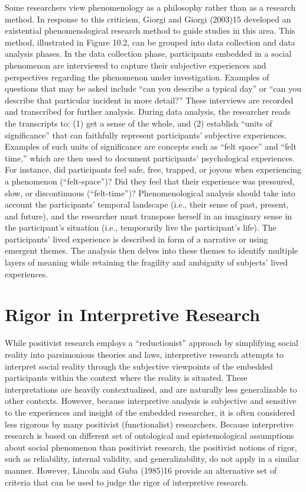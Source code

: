 Some researchers view phenomenology as a philosophy rather than as a research method. In response to this criticism, Giorgi and Giorgi (2003)15 developed an existential phenomenological research method to guide studies in this area. This method, illustrated in Figure 10.2, can be grouped into data collection and data analysis phases. In the data collection phase, participants embedded in a social phenomenon are interviewed to capture their subjective experiences and perspectives regarding the phenomenon under investigation. Examples of questions that may be asked include “can you describe a typical day” or “can you describe that particular incident in more detail?” These interviews are recorded and transcribed for further analysis. During data analysis, the researcher reads the transcripts to: (1) get a sense of the whole, and (2) establish “units of significance” that can faithfully represent participants’ subjective experiences. Examples of such units of significance are concepts such as “felt space” and “felt time,” which are then used to document participants’ psychological experiences. For instance, did participants feel safe, free, trapped, or joyous when experiencing a phenomenon (“felt-space”)? Did they feel that their experience was pressured, slow, or discontinuous (“felt-time”)? Phenomenological analysis should take into account the participants’ temporal landscape (i.e., their sense of past, present, and future), and the researcher must transpose herself in an imaginary sense in the participant’s situation (i.e., temporarily live the participant’s life). The participants’ lived experience is described in form of a narrative or using emergent themes. The analysis then delves into these themes to identify multiple layers of meaning while retaining the fragility and ambiguity of subjects’ lived experiences.

\section{Rigor in Interpretive Research}

While positivist research employs a “reductionist” approach by simplifying social reality into parsimonious theories and laws, interpretive research attempts to interpret social reality through the subjective viewpoints of the embedded participants within the context where the reality is situated. These interpretations are heavily contextualized, and are naturally less generalizable to other contexts. However, because interpretive analysis is subjective and sensitive to the experiences and insight of the embedded researcher, it is often considered less rigorous by many positivist (functionalist) researchers. Because interpretive research is based on different set of ontological and epistemological assumptions about social phenomenon than positivist research, the positivist notions of rigor, such as reliability, internal validity, and generalizability, do not apply in a similar manner. However, Lincoln and Guba (1985)16 provide an alternative set of criteria that can be used to judge the rigor of interpretive research.


